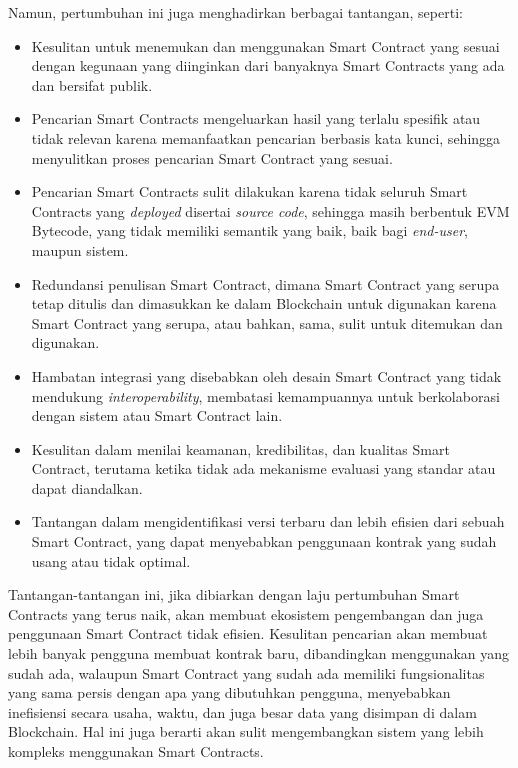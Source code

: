 Namun, pertumbuhan ini juga menghadirkan berbagai tantangan, seperti:
\begin{itemize}
    \item Kesulitan untuk menemukan dan menggunakan Smart Contract yang sesuai dengan kegunaan yang diinginkan dari banyaknya Smart Contracts yang ada dan bersifat publik.
    \item Pencarian Smart Contracts mengeluarkan hasil yang terlalu spesifik atau tidak relevan karena memanfaatkan pencarian berbasis kata kunci, sehingga menyulitkan proses pencarian Smart Contract yang sesuai.
    \item Pencarian Smart Contracts sulit dilakukan karena tidak seluruh Smart Contracts yang \textit{deployed} disertai \textit{source code}, sehingga masih berbentuk EVM Bytecode, yang tidak memiliki semantik yang baik, baik bagi \textit{end-user}, maupun sistem. 
    \item Redundansi penulisan Smart Contract, dimana Smart Contract yang serupa tetap ditulis dan dimasukkan ke dalam Blockchain untuk digunakan karena Smart Contract yang serupa, atau bahkan, sama, sulit untuk ditemukan dan digunakan.
    \item Hambatan integrasi yang disebabkan oleh desain Smart Contract yang tidak mendukung \textit{interoperability}, membatasi kemampuannya untuk berkolaborasi dengan sistem atau Smart Contract lain.
    \item Kesulitan dalam menilai keamanan, kredibilitas, dan kualitas Smart Contract, terutama ketika tidak ada mekanisme evaluasi yang standar atau dapat diandalkan.
    \item Tantangan dalam mengidentifikasi versi terbaru dan lebih efisien dari sebuah Smart Contract, yang dapat menyebabkan penggunaan kontrak yang sudah usang atau tidak optimal.
\end{itemize}

Tantangan-tantangan ini, jika dibiarkan dengan laju pertumbuhan Smart Contracts yang terus naik, akan membuat ekosistem pengembangan dan juga penggunaan Smart Contract tidak efisien. Kesulitan pencarian akan membuat lebih banyak pengguna membuat kontrak baru, dibandingkan menggunakan yang sudah ada, walaupun Smart Contract yang sudah ada memiliki fungsionalitas yang sama persis dengan apa yang dibutuhkan pengguna, menyebabkan inefisiensi secara usaha, waktu, dan juga besar data yang disimpan di dalam Blockchain. Hal ini juga berarti akan sulit mengembangkan sistem yang lebih kompleks menggunakan Smart Contracts.

